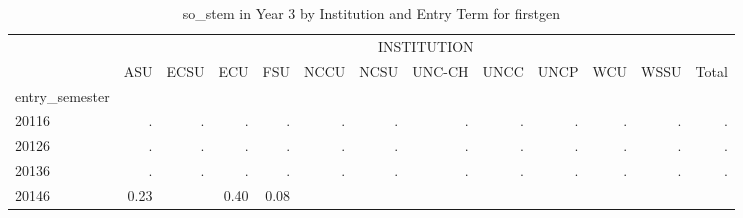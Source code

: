 \begin{table}[!h]
\caption{so\_stem in Year 3 by Institution and Entry Term for firstgen}
\centering
\begin{tabular}{lllllllllllll}
\cline{1-13}
\multicolumn{1}{c}{} &
  \multicolumn{12}{|c}{INSTITUTION} \\
\multicolumn{1}{c}{} &
  \multicolumn{1}{|r}{ASU} &
  \multicolumn{1}{r}{ECSU} &
  \multicolumn{1}{r}{ECU} &
  \multicolumn{1}{r}{FSU} &
  \multicolumn{1}{r}{NCCU} &
  \multicolumn{1}{r}{NCSU} &
  \multicolumn{1}{r}{UNC-CH} &
  \multicolumn{1}{r}{UNCC} &
  \multicolumn{1}{r}{UNCP} &
  \multicolumn{1}{r}{WCU} &
  \multicolumn{1}{r}{WSSU} &
  \multicolumn{1}{r}{Total} \\
\cline{1-13}
\multicolumn{1}{l}{entry\_semester} &
  \multicolumn{1}{|r}{} &
  \multicolumn{1}{r}{} &
  \multicolumn{1}{r}{} &
  \multicolumn{1}{r}{} &
  \multicolumn{1}{r}{} &
  \multicolumn{1}{r}{} &
  \multicolumn{1}{r}{} &
  \multicolumn{1}{r}{} &
  \multicolumn{1}{r}{} &
  \multicolumn{1}{r}{} &
  \multicolumn{1}{r}{} &
  \multicolumn{1}{r}{} \\
\multicolumn{1}{l}{\hspace{1em}20116} &
  \multicolumn{1}{|r}{.} &
  \multicolumn{1}{r}{.} &
  \multicolumn{1}{r}{.} &
  \multicolumn{1}{r}{.} &
  \multicolumn{1}{r}{.} &
  \multicolumn{1}{r}{.} &
  \multicolumn{1}{r}{.} &
  \multicolumn{1}{r}{.} &
  \multicolumn{1}{r}{.} &
  \multicolumn{1}{r}{.} &
  \multicolumn{1}{r}{.} &
  \multicolumn{1}{r}{.} \\
\multicolumn{1}{l}{\hspace{1em}20126} &
  \multicolumn{1}{|r}{.} &
  \multicolumn{1}{r}{.} &
  \multicolumn{1}{r}{.} &
  \multicolumn{1}{r}{.} &
  \multicolumn{1}{r}{.} &
  \multicolumn{1}{r}{.} &
  \multicolumn{1}{r}{.} &
  \multicolumn{1}{r}{.} &
  \multicolumn{1}{r}{.} &
  \multicolumn{1}{r}{.} &
  \multicolumn{1}{r}{.} &
  \multicolumn{1}{r}{.} \\
\multicolumn{1}{l}{\hspace{1em}20136} &
  \multicolumn{1}{|r}{.} &
  \multicolumn{1}{r}{.} &
  \multicolumn{1}{r}{.} &
  \multicolumn{1}{r}{.} &
  \multicolumn{1}{r}{.} &
  \multicolumn{1}{r}{.} &
  \multicolumn{1}{r}{.} &
  \multicolumn{1}{r}{.} &
  \multicolumn{1}{r}{.} &
  \multicolumn{1}{r}{.} &
  \multicolumn{1}{r}{.} &
  \multicolumn{1}{r}{.} \\
\multicolumn{1}{l}{\hspace{1em}20146} &
  \multicolumn{1}{|r}{0.23} &
  \multicolumn{1}{r}{} &
  \multicolumn{1}{r}{0.40} &
  \multicolumn{1}{r}{0.08} &

\end{tabular}
\end{table}
